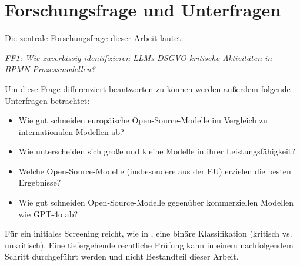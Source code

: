 \section{Forschungsfrage und Unterfragen}\label{sec:forschungsfrage-und-unterfragen}

Die zentrale Forschungsfrage dieser Arbeit lautet:

\emph{FF1: Wie zuverlässig identifizieren \acp{LLM} \ac{DSGVO}-kritische Aktivitäten in \ac{BPMN}-Prozessmodellen?}

Um diese Frage differenziert beantworten zu können werden außerdem folgende Unterfragen betrachtet:

\begin{itemize}
    \item {} Wie gut schneiden europäische Open-Source-Modelle im Vergleich zu internationalen Modellen ab?
    \item {} Wie unterscheiden sich große und kleine Modelle in ihrer Leistungsfähigkeit?
    \item {} Welche Open-Source-Modelle (insbesondere aus der EU) erzielen die besten Ergebnisse?
    \item {} Wie gut schneiden Open-Source-Modelle gegenüber kommerziellen Modellen wie GPT-4o ab?
\end{itemize}

Für ein initiales Screening reicht, wie in \cite{nake2023towards}, eine binäre Klassifikation (kritisch vs. unkritisch). Eine tiefergehende rechtliche Prüfung kann in einem nachfolgendem Schritt durchgeführt werden und nicht Bestandteil dieser Arbeit.